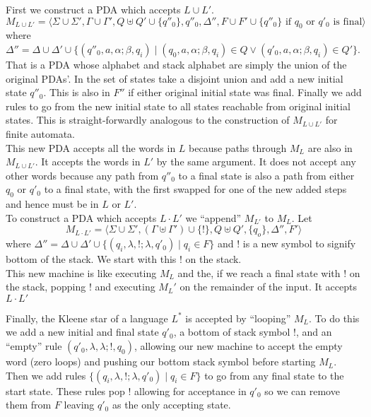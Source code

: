 \documentclass[defaultpackages]{simplereport}
\begin{document}
\begin{itemize}[label=]
     First we construct a PDA which accepts $L \cup L'$. $M_{L \cup L'} =
     \langle \Sigma \cup \Sigma', \Gamma \cup \Gamma', Q \uplus Q' \cup \{q''_0\},
     q''_0, \Delta'', F \cup F' \cup \{q''_0\} \text{ if $q_0$ or $q'_0$ is final}
     \rangle$ where $\Delta'' = \Delta \cup \Delta' \cup \{(q''_0, a, \alpha ;
     \beta, q_i) \mid (q_0, a, \alpha ; \beta, q_i) \in Q \lor (q'_0, a, \alpha
     ; \beta, q_i) \in Q'\}$.
     That is a PDA whose alphabet and stack alphabet are simply the union of the
     original PDAs'. In the set of states take a disjoint union and add a new
     initial state $q''_0$. This is also in $F''$ if either original initial state was final.
     Finally we add rules to go from the new initial state to all states
     reachable from original initial states. This is straight-forwardly analogous to the
     construction of $M_{L \cup L'}$ for finite automata.\\
     This new PDA accepts all the words in $L$ because paths through $M_L$ are
     also in $M_{L \cup L'}$. It accepts the words in $L'$ by the same argument.
     It does not accept any other words because any path from $q''_0$ to a final
     state is also a path from either $q_0$ or $q'_0$ to a final state, with the
     first swapped for one of the new added steps and hence must be in $L$ or
     $L'$.\\

     
     To construct a PDA which accepts $L \cdot L'$ we ``append'' $M_{L'}$ to $M_L$. Let
     $$M_{L \cdot L'} = \langle \Sigma \cup \Sigma', (\Gamma \uplus \Gamma')
     \cup \{!\}, Q
     \uplus Q', \{q_o\}, \Delta'', F' \rangle$$ where $\Delta'' = \Delta \cup
     \Delta' \cup \{(q_i, \lambda, !; \lambda, q'_0) \mid q_i \in F\}$ and $!$
     is a new symbol to signify bottom of the stack. We start with this $!$ on
     the stack.\\
     This new machine is like executing $M_L$ and the, if we reach a final state
     with $!$ on the stack, popping $!$ and executing $M_L'$ on the remainder of
     the input. It accepts $L \cdot L'$

     Finally, the Kleene star of a language $L^*$ is accepted by ``looping''
     $M_L$. To do this we add a new initial and final state $q'_0$, a
     bottom of stack symbol $!$, and an ``empty'' rule $(q'_0, \lambda, \lambda;
     !, q_0)$, allowing our new machine to accept the empty word (zero loops)
     and pushing our bottom stack symbol before starting $M_L$. Then we add
     rules $\{(q_i, \lambda, !; \lambda, q'_0) \mid q_i \in F\}$ to go from any
     final state to the start state. These rules pop $!$ allowing for acceptance
     in $q'_0$ so we can remove them from $F$ leaving $q'_0$ as the only
     accepting state.
     
\end{itemize}
\end{document}
